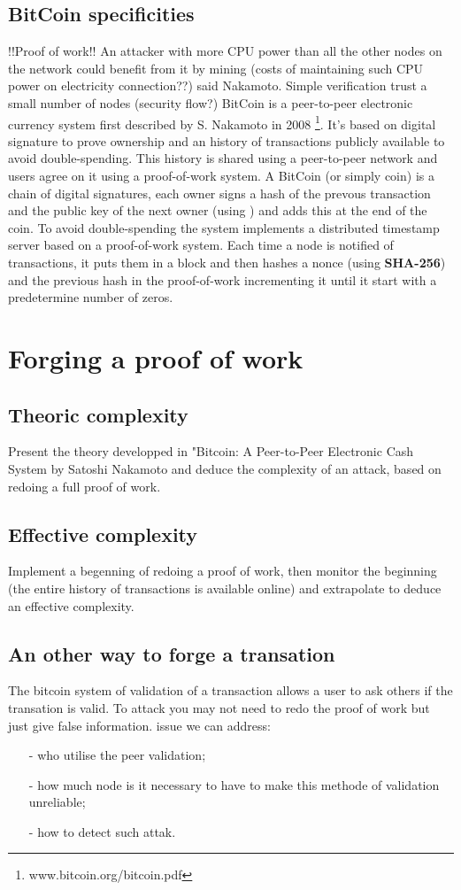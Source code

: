 \documentclass{acm_proc_article-sp}
\begin{document}
\subsection{BitCoin specificities}
!!Proof of work!!
An attacker with more CPU power than all the other nodes on the network
could benefit from it by mining (costs of maintaining such CPU
power on electricity connection??) said Nakamoto. Simple verification 
trust a small number of nodes (security flow?)
BitCoin is a peer-to-peer electronic currency system first described
by S. Nakamoto in 2008 \footnote{www.bitcoin.org/bitcoin.pdf}. It's based on
digital signature to prove ownership and an history of transactions publicly 
available to avoid double-spending. This history is shared using a peer-to-peer 
network and users agree on it using a proof-of-work system.
A BitCoin (or simply coin) is a chain of digital signatures, each owner signs
a hash of the prevous transaction and the public key of the next owner 
(using ) and adds this at the end of the coin. To avoid 
double-spending the system implements a distributed timestamp server
based on a proof-of-work system. Each time a node is notified of 
transactions, it puts them in a block and then hashes a nonce 
(using \textbf{SHA-256}) and the previous hash in the proof-of-work 
incrementing it until it start with a predetermine number of zeros.     

\section{Forging a proof of work}
\subsection{Theoric complexity}
Present the theory developped in "Bitcoin: A Peer-to-Peer Electronic Cash System
by Satoshi Nakamoto and deduce the complexity of an attack, based on 
redoing a full proof of work.

\subsection{Effective complexity}
Implement a begenning of redoing a proof of work, then monitor the 
beginning (the entire history of transactions is available online)
and extrapolate to deduce an effective complexity.
\subsection{An other way to forge a transation}
The bitcoin system of validation of a transaction allows a user to ask others if the transation is valid. To attack you may not need to redo the proof of work but just give false information. issue we can address:
\begin{itemize}

\item[-] who utilise the peer validation;
\item [-]how much node is it necessary to have to make this methode of validation unreliable;
\item[-] how to detect such attak.

\end{itemize}
\end{document}
